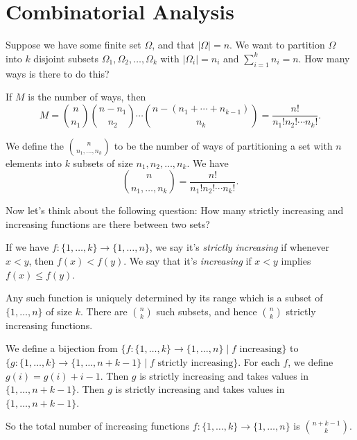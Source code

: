 \documentclass[a4paper]{scrreprt}
\begin{document}
\section{Combinatorial Analysis}

Suppose we have some finite set $\Omega$, and that $|\Omega| = n$. We want to partition $\Omega$ into $k$ disjoint subsets $\Omega_1, \Omega_2, \dots, \Omega_k$ with $|\Omega_i| = n_i$ and $\sum_{i = 1}^k n_i = n$. How many ways is there to do this?

If $M$ is the number of ways, then
$$
M = \binom{n}{n_1} \binom{n - n_1}{n_2} \cdots \binom{n - (n_1 + \cdots + n_{k - 1})}{n_k} = \frac{n!}{n_1! n_2 !\cdots n_k !}.
$$

\begin{definition}
	We define the  $\binom{n}{n_1, \dots, n_k}$ to be the number of ways of partitioning a set with $n$ elements into $k$ subsets of size $n_1, n_2, \dots, n_k$. We have
	$$
	\binom{n}{n_1, \dots, n_k} = \frac{n!}{n_1! n_2 !\cdots n_k !}.
	$$
\end{definition}
	
Now let's think about the following question: How many strictly increasing and increasing functions are there between two sets?

If we have $f:\{1, \dots, k\} \rightarrow \{1, \dots, n\}$, we say it's \emph{strictly increasing} if whenever $x < y$, then $f(x) < f(y)$. We say that it's \emph{increasing} if $x < y$ implies $f(x) \leq f(y)$.

Any such function is uniquely determined by its range which is a subset of $\{1, \dots, n\}$ of size $k$. There are $\binom{n}{k}$ such subsets, and hence $\binom{n}{k}$ strictly increasing functions.

We define a bijection from $\{f : \{1, \dots, k \} \rightarrow \{1, \dots, n\} \mid f \text{ increasing}\}$ to $\{g : \{1, \dots, k \} \rightarrow \{1, \dots, n + k - 1\} \mid f \text{ strictly increasing}\}$. For each $f$, we define $g(i) = g(i) + i - 1$. Then $g$ is strictly increasing and takes values in $\{1, \dots, n + k - 1\}$. Then $g$ is strictly increasing and takes values in $\{1, \dots, n + k - 1\}$.

So the total number of increasing functions $f: \{1, \dots, k\} \rightarrow \{1, \dots, n\}$ is $\binom{n + k - 1}{k}$.
\end{document}
